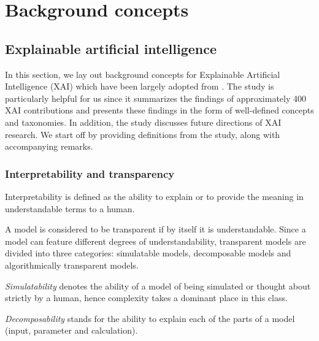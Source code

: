 \chapter{Background concepts}

\label{chapter:background}

\section{Explainable artificial intelligence}

\label{section:xai}

In this section, we lay out background concepts for Explainable Artificial Intelligence (XAI) which have been largely adopted from \citet{arrieta2020explainable}. The study is particularly helpful for us since it summarizes the findings of approximately 400 XAI contributions and presents these findings in the form of well-defined concepts and taxonomies. In addition, the study discusses future directions of XAI research. We start off by providing definitions from the study, along with accompanying remarks.

\subsection{Interpretability and transparency}

\begin{definition}
  Interpretability is defined as the ability to explain or to provide the meaning in understandable terms to a human. 
\end{definition}

\begin{definition}
  A model is considered to be transparent if by itself it is understandable. Since a model can feature different degrees of understandability, transparent models are divided into three categories: simulatable models, decomposable models and algorithmically transparent models. 
\end{definition}

\begin{remark}
  \textit{Simulatability} denotes the ability of a model of being simulated or thought about strictly by a human, hence complexity takes a dominant place in this class.
\end{remark}

\begin{remark}
  \textit{Decomposability} stands for the ability to explain each of the parts of a model (input, parameter and calculation).
\end{remark}

